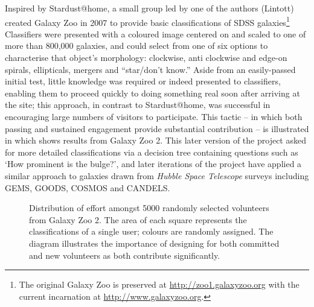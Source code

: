 \documentclass{ar2e}
\begin{document}
Inspired by Stardust@home, a small group led by one of the authors (Lintott) created
Galaxy Zoo in 2007 to provide basic classifications of SDSS
galaxies\footnote{The original Galaxy Zoo is preserved at
\url{http://zoo1.galaxyzoo.org} with the current incarnation at
\url{http://www.galaxyzoo.org}.} Classifiers were presented with a coloured
image centered on and scaled to one of more than 800,000 galaxies, and could
select from one of six options to characterise that object's morphology: 
clockwise, anti clockwise and edge-on spirals,
ellipticals, mergers and ``star/don't know.'' Aside from  an easily-passed
initial test, little knowledge was required or indeed presented to classifiers,
enabling them to proceed quickly to doing something real soon after arriving at the
site; this approach, in contrast to Stardust@home, was
successful in encouraging large numbers of visitors to participate. 
This tactic -- in which both passing and sustained engagement provide
substantial contribution -- is illustrated in  which shows results from
Galaxy Zoo 2. This later version of the project asked for more detailed
classifications via a decision tree containing questions such as `How prominent
is the bulge?', and later iterations of the project have applied a similar
approach to galaxies drawn from \emph{Hubble Space Telescope} surveys including
\textsc{GEMS, GOODS, COSMOS} and \textsc{CANDELS}. 


\begin{figure}[!ht]
\caption{Distribution of effort amongst 5000 randomly selected volunteers from
Galaxy Zoo 2. The area of each square represents the classifications of a single
user; colours are randomly assigned. The diagram illustrates the importance of
designing for both committed and new volunteers as both contribute significantly.}
\end{figure}


\end{document}
